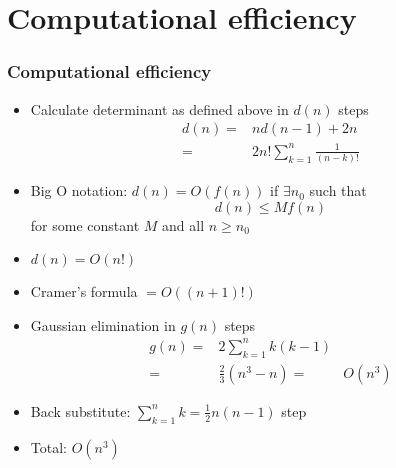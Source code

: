 \documentclass[compress]{beamer}
\theoremstyle{definition}
\begin{document}
\section{Computational efficiency}

\begin{frame}
  \frametitle{Computational efficiency}
  \begin{itemize}
  \item Calculate determinant as defined above in $d(n)$ steps
    \begin{align*}
      d(n) = & n d(n-1) + 2n  \\
      = & 2n! \sum_{k=1}^n \frac{1}{(n-k)!} 
    \end{align*}
  \item Big O notation: $d(n) = O(f(n))$ if $\exists n_0$ such
    that
    \[
    d(n) \leq M f(n) 
    \]
    for some constant $M$ and all $n \geq n_0$
  \item $d(n) = O(n!)$
  \item Cramer's formula $=O((n+1)!)$
  \end{itemize}
  
\end{frame}

\begin{frame}
  \begin{itemize}
  \item Gaussian elimination in $g(n)$ steps
    \begin{align*}
      g(n) = & 2 \sum_{k=1}^n k(k-1) \\
      = & \frac{2}{3} (n^3 - n)
      = & O(n^3)
    \end{align*}
  \item Back substitute: $\sum_{k=1}^n k = \frac{1}{2}
    n(n-1)$ step
  \item Total: $O(n^3)$
  \end{itemize}  
\end{frame}

\end{document}
